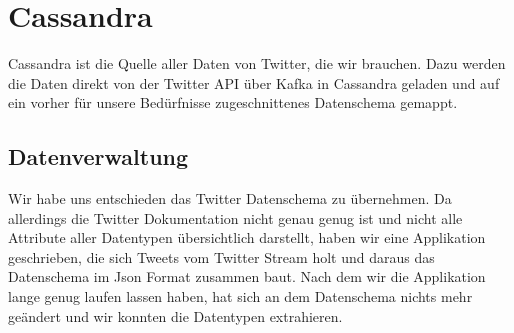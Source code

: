 \chapter{Cassandra}
\label{chap:cassandra}
Cassandra ist die Quelle aller Daten von Twitter, die wir brauchen. Dazu werden die Daten direkt von der Twitter API über Kafka in Cassandra geladen und auf ein vorher für unsere Bedürfnisse zugeschnittenes Datenschema gemappt.

\section{Datenverwaltung}
Wir habe uns entschieden das Twitter Datenschema zu übernehmen. Da allerdings die Twitter Dokumentation nicht genau genug ist und nicht alle Attribute aller Datentypen übersichtlich darstellt, haben wir eine Applikation geschrieben, die sich Tweets vom Twitter Stream holt und daraus das Datenschema im Json Format zusammen baut. Nach dem wir die Applikation lange genug laufen lassen haben, hat sich an dem Datenschema nichts mehr geändert und wir konnten die Datentypen extrahieren.\\

